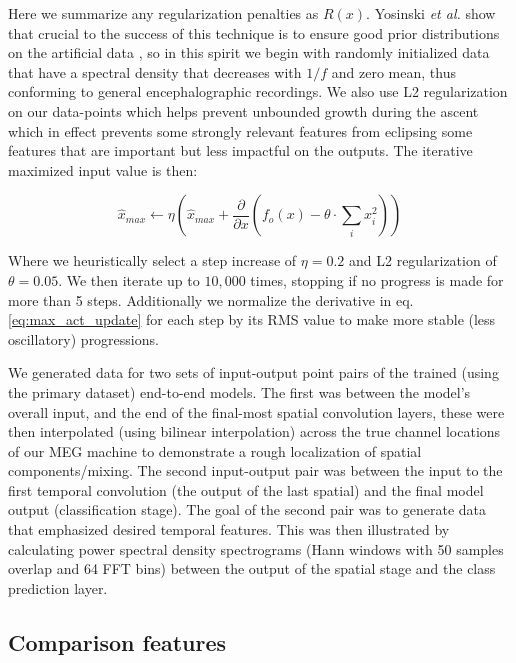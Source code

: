 \documentclass[fleqn,10pt]{wlscirep}
\begin{document}
Here we summarize any regularization penalties as $R(x)$. Yosinski {\em et al.} show that crucial to the success of this technique is to ensure good prior distributions on the artificial data \cite{Yosinski2015}, so in this spirit we begin with randomly initialized data that have a spectral density that decreases with $1/f$ and zero mean, thus conforming to general encephalographic recordings. We also use L2 regularization on our data-points which helps prevent unbounded growth during the ascent which in effect prevents some strongly relevant features from eclipsing some features that are important but less impactful on the outputs. The iterative maximized input value is then:

\begin{equation} \label{eq:max_act_update}
  \hat{x}_{max} \leftarrow \eta \left(\hat{x}_{max} + \frac{\partial }{\partial x}(f_o(x) - \theta \cdot {}\sum_ix_i^2) \right)
\end{equation}

Where we heuristically select a step increase of $\eta = 0.2$ and L2 regularization of $\theta = 0.05$. We then iterate up to $10,000$ times, stopping if no progress is made for more than 5 steps. Additionally we normalize the derivative in eq. \ref{eq:max_act_update} for each step by its RMS value to make more stable (less oscillatory) progressions.

We generated data for two sets of input-output point pairs of the trained (using the primary dataset) end-to-end models. The first was between the model's overall input, and the end of the final-most spatial convolution layers, these were then interpolated (using bilinear interpolation) across the true channel locations of our MEG machine to demonstrate a rough localization of spatial components/mixing. The second input-output pair was between the input to the first temporal convolution (the output of the last spatial) and the final model output (classification stage). The goal of the second pair was to generate data that emphasized desired temporal features. This was then illustrated by calculating power spectral density spectrograms (Hann windows with 50 samples overlap and 64 FFT bins) between the output of the spatial stage and the class prediction layer.

\subsection*{Comparison features}
\end{document}
